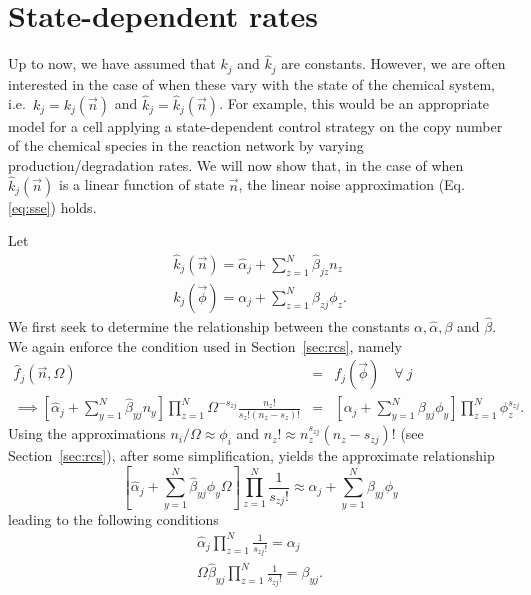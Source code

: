 \documentclass[10pt,letterpaper]{article}
\begin{document}
\section{State-dependent rates}

Up to now, we have assumed that $k_j$ and $\hat{k}_j$ are constants. However, we are often interested in the case of when these vary with the state of the chemical system, i.e.\ $k_j = k_j(\vec{n})$ and $\hat{k}_j = \hat{k}_j(\vec{n})$. For example, this would be an appropriate model for a cell applying a state-dependent control strategy on the copy number of the chemical species in the reaction network by varying production/degradation rates. We will now show that, in the case of when $\hat{k}_j(\vec{n})$ is a linear function of state $\vec{n}$, the linear noise approximation (Eq.\eqref{eq:sse}) holds. 

Let 
\begin{eqnarray}
\hat{k}_j(\vec{n}) = \hat{\alpha}_j + \sum_{z=1}^N \hat{\beta}_{jz} n_z \\
k_j(\vec{\phi}) = \alpha_j + \sum_{z=1}^N \beta_{zj} \phi_z.
\end{eqnarray}
We first seek to determine the relationship between the constants $\alpha, \hat{\alpha}, \beta$ and $\hat{\beta}$. We again enforce the condition used in Section~\ref{sec:rcs}, namely
\begin{eqnarray}
\hat{f}_j(\vec{n}, \Omega) &=& f_j(\vec{\phi})\quad \forall\ j \\
\implies \left[\hat{\alpha}_j + \sum_{y=1}^N \hat{\beta}_{yj}n_y\right]\prod_{z=1}^N \Omega^{-s_{zj}}\frac{n_z!}{s_z!(n_z-s_z)!} &=& \left[ \alpha_j + \sum_{y=1}^N \beta_{yj} \phi_y \right] \prod_{z=1}^N \phi_z^{s_{zj}}.
\end{eqnarray}
Using the approximations $n_i/\Omega \approx \phi_i$ and $n_z! \approx n_z^{s_{zj}}(n_z - s_{zj})!$ (see Section~\ref{sec:rcs}), after some simplification, yields the approximate relationship
\begin{equation}
\left[\hat{\alpha}_j + \sum_{y=1}^N \hat{\beta}_{yj} \phi_y \Omega \right] \prod_{z=1}^N \frac{1}{s_{zj}!} \approx \alpha_j + \sum_{y=1}^N \beta_{yj}\phi_y
\end{equation}
leading to the following conditions
\begin{eqnarray}
\hat{\alpha}_j \prod_{z=1}^N \frac{1}{s_{zj}!} = \alpha_j \nonumber \\
\Omega \hat{\beta}_{yj} \prod_{z=1}^N \frac{1}{s_{zj}!} = \beta_{yj}. \label{eq:micro_macro_rc_state}
\end{eqnarray}
\end{document}
